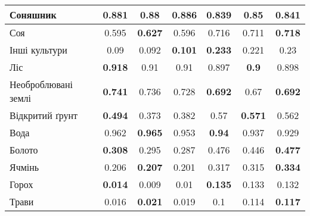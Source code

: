 \begin{table}[!ht]
\begin{tabular}{|K|S|C|C|S|C|C|}
        \hline Соняшник                      & 0.881                                     & 0.88                                      & \textbf{0.886}  & 0.839          & \textbf{0.85}  & 0.841          \\
        \hline Соя                           & 0.595                                     & \textbf{0.627}                            & 0.596           & 0.716          & 0.711          & \textbf{0.718} \\
        \hline Інші культури                 & 0.09                                      & 0.092                                     & \textbf{0.101}  & \textbf{0.233} & 0.221          & 0.23           \\
        \hline Ліс                           & \textbf{0.918}                            & 0.91                                      & 0.91            & 0.897          & \textbf{0.9}   & 0.898          \\
        \hline Необроблювані землі           & \textbf{0.741}                            & 0.736                                     & 0.728           & \textbf{0.692} & 0.67           & \textbf{0.692} \\
        \hline Відкритий ґрунт               & \textbf{0.494}                            & 0.373                                     & 0.382           & 0.57           & \textbf{0.571} & 0.562          \\
        \hline Вода                          & 0.962                                     & \textbf{0.965}                            & 0.953           & \textbf{0.94}  & 0.937          & 0.929          \\
        \hline Болото                        & \textbf{0.308}                            & 0.295                                     & 0.287           & 0.476          & 0.446          & \textbf{0.477} \\
        \hline Ячмінь                        & 0.206                                     & \textbf{0.207}                            & 0.201           & 0.317          & 0.315          & \textbf{0.334} \\
        \hline Горох                         & \textbf{0.014}                            & 0.009                                     & 0.01            & \textbf{0.135} & 0.133          & 0.132          \\
        \hline Трави                         & 0.016                                     & \textbf{0.021}                            & 0.019           & 0.1            & 0.114          & \textbf{0.117} \\

\end{tabular}
\end{table}
